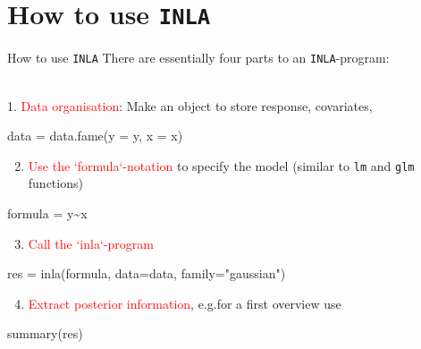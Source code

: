 \documentclass[
  handout]{beamer}
\newenvironment{Shaded}{\begin{snugshade}}{\end{snugshade}}
\newcommand{\AttributeTok}[1]{\textcolor[rgb]{0.77,0.63,0.00}{#1}}
\newcommand{\FunctionTok}[1]{\textcolor[rgb]{0.00,0.00,0.00}{#1}}
\newcommand{\NormalTok}[1]{#1}
\newcommand{\OtherTok}[1]{\textcolor[rgb]{0.56,0.35,0.01}{#1}}
\newcommand{\SpecialCharTok}[1]{\textcolor[rgb]{0.00,0.00,0.00}{#1}}
\newcommand{\StringTok}[1]{\textcolor[rgb]{0.31,0.60,0.02}{#1}}
\providecommand{\tightlist}{%
  \setlength{\itemsep}{0pt}\setlength{\parskip}{0pt}}
\begin{document}
\hypertarget{how-to-use-inla}{%
\section{\texorpdfstring{How to use
\texttt{INLA}}{How to use INLA}}\label{how-to-use-inla}}

\begin{frame}[fragile]{How to use \texttt{INLA}}
\protect\hypertarget{how-to-use-inla-1}{}
There are essentially four parts to an \texttt{INLA}-program:\\
\strut \\
1. \textcolor{red}{Data organisation}: Make an object to store response,
covariates,

\begin{Shaded}
\begin{Highlighting}[]
\NormalTok{data }\OtherTok{=} \FunctionTok{data.fame}\NormalTok{(}\AttributeTok{y =}\NormalTok{ y, }\AttributeTok{x =}\NormalTok{ x)}
\end{Highlighting}
\end{Shaded}

\begin{enumerate}
\setcounter{enumi}{1}
\tightlist
\item
  \textcolor{red}{Use the `formula`-notation} to specify the model
  (similar to \texttt{lm} and \texttt{glm} functions)
\end{enumerate}

\begin{Shaded}
\begin{Highlighting}[]
\NormalTok{formula }\OtherTok{=}\NormalTok{ y}\SpecialCharTok{\textasciitilde{}}\NormalTok{x}
\end{Highlighting}
\end{Shaded}

\begin{enumerate}
\setcounter{enumi}{2}
\tightlist
\item
  \textcolor{red}{Call the `inla`-program}
\end{enumerate}

\begin{Shaded}
\begin{Highlighting}[]
\NormalTok{res }\OtherTok{=} \FunctionTok{inla}\NormalTok{(formula, }\AttributeTok{data=}\NormalTok{data, }\AttributeTok{family=}\StringTok{"gaussian"}\NormalTok{)}
\end{Highlighting}
\end{Shaded}

\begin{enumerate}
\setcounter{enumi}{3}
\tightlist
\item
  \textcolor{red}{Extract posterior information}, e.g.for a first
  overview use
\end{enumerate}

\begin{Shaded}
\begin{Highlighting}[]
\FunctionTok{summary}\NormalTok{(res)}
\end{Highlighting}
\end{Shaded}
\end{frame}
\end{document}
